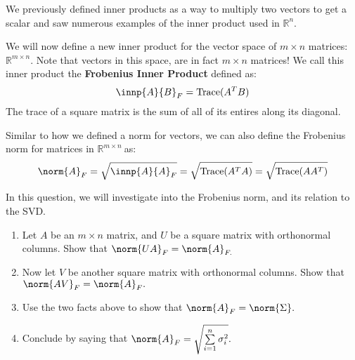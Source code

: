 

We previously defined inner products as a way to multiply two vectors to get a scalar and saw numerous examples of the inner product used in $\mathbb{R}^{n}.$

We will now define a new inner product for the vector space of $m \times n$ matrices: $\mathbb{R}^{m \times n}.$
Note that vectors in this space, are in fact $m \times n$ matrices!
We call this inner product the \textbf{Frobenius Inner Product} defined as:
\begin{equation}
  \innp{A}{B}_{F} = \text{Trace}(A^{T} B)
\end{equation}
The trace of a square matrix is the sum of all of its entires along its diagonal.

Similar to how we defined a norm for vectors, we can also define the Frobenius norm for matrices in $\mathbb{R}^{m \times n}\ $as:
\begin{equation}
  \norm{A}_{F} = \sqrt{\innp{A}{A}_{F}} = \sqrt{\text{Trace}(A^{T} A)} = \sqrt{\text{Trace}(A A^{T})}
\end{equation}

In this question, we will investigate into the Frobenius norm, and its relation to the SVD.

\begin{enumerate}
  \item Let $A$ be an $m \times n$ matrix, and $U$ be a square matrix with orthonormal columns. Show that $\norm{UA}_{F} = \norm{A}_{F.}$


  \item Now let $V$ be another square matrix with orthonormal columns. Show that $\norm{AV}_{F} = \norm{A}_{F}.$


  \item Use the two facts above to show that $\norm{A}_{F} = \norm{\Sigma}.$


  \item Conclude by saying that $\norm{A}_{F} = \sqrt{\sum\limits_{i = 1}^{n} \sigma_{i}^{2}}.$


\end{enumerate}